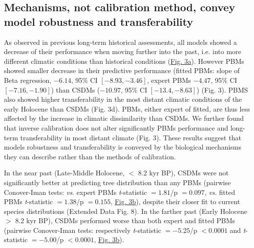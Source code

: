 \documentclass[pdflatex, sn-nature]{sn-jnl}%
\begin{document}
\subsection{Mechanisms, not calibration method, convey model robustness and transferability }

As observed in previous long-term historical assessments, all models showed a decrease of their performance when moving further into the past, i.e. into more different climatic conditions than historical conditions (\hyperref[past_performance]{Fig. 3a}).
However PBMs showed smaller decrease in their predictive performance (fitted PBMs: slope of Beta regression, $-6.14$, 95\% CI $[-8.93, -3.46]$, expert PBMs $-4.47$, 95\% CI $[-7.16, -1.90]$) than CSDMs ($-10.97$, 95\% CI $[-13.4, -8.63]$) (Fig. 3). PBMS also showed higher transferability in the most distant climatic conditions of the early Holocene than CSDMs (Fig. 3d). PBMs, either expert of fitted, are thus less affected by the increase in climatic dissimilarity than CSDMs.  We further found that inverse calibration does not alter significantly PBMs performance and long-term transferability in most distant climate (Fig. 3).  These results suggest that models robustness and transferability is conveyed by the biological mechanisms they can describe rather than the methods of calibration.

In the near past (Late-Middle Holocene, $<$ 8.2 kyr BP), CSDMs were not significantly better at predicting tree distribution than any PBMs (pairwise Conover-Iman tests: \emph{vs.} expert PBMs \emph{t}-statistic $=1.81$/p $=0.097$, \emph{vs.} fitted PBMs \emph{t}-statistic $=1.38$/p $=0.155$, \hyperref[past_performance]{Fig. 3b}), despite their closer fit to current species distributions (Extended Data Fig. 8). In the farther past (Early Holocene $>$ 8.2 kyr BP), CSDMs performed worse than both expert and fitted PBMs (pairwise Conover-Iman tests: respectively \emph{t}-statistic $=-5.25$/p $<0.0001$ and \emph{t}-statistic $=-5.00$/p $<0.0001$, \hyperref[past_performance]{Fig. 3b}). 
\end{document}
